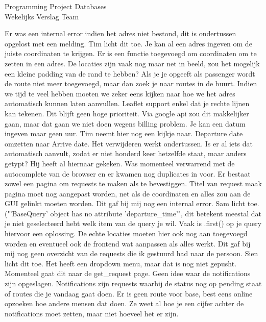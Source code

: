 \documentclass{article}
\newcounter{team}
\begin{document}
\begin{Minutes}{Programming Project Databases \\ Wekelijks Verslag Team }

				    Er was een internal error indien het adres niet bestond, dit is ondertussen opgelost met een melding.
				    Tim licht dit toe. Je kan al een adres ingeven om de juiste coordinaten te krijgen. Er is een functie toegevoegd om coordinaten om te zetten in een adres. De locaties zijn vaak nog maar net in beeld, zou het mogelijk een kleine padding van de rand te hebben? Als je je opgeeft als passenger wordt de route niet meer toegevoegd, maar dan zoek je naar routes in de buurt. Indien we tijd te veel hebben moeten we zeker eens kijken naar hoe we het adres automatisch kunnen laten aanvullen. Leaflet support enkel dat je rechte lijnen kan tekenen. Dit blijft geen hoge prioriteit. Via google api zou dit makkelijker gaan, maar dat gaan we niet doen wegens billing problem. Je kan een datum ingeven maar geen uur. Tim neemt hier nog een kijkje naar. Departure date omzetten naar Arrive date.
			        Het verwijderen werkt ondertussen. Is er al iets dat automatisch aanvult, zodat er niet honderd keer hetzelfde staat, maar anders getypt? Hij heeft al hiernaar gekeken. Was momenteel verwarrend met de autocomplete van de browser en er kwamen nog duplicates in voor.
					Er bestaat zowel een pagina om requests te maken als te bevestiggen. Titel van request maak pagina moet nog aangepast worden, net als de coordinaten en alles zou aan de GUI gelinkt moeten worden.
				    Dit gaf bij mij nog een internal error. Sam licht toe. ("'BaseQuery' object has no attribute 'departure\_time'", dit betekent meestal dat je niet geselecteerd hebt welk item van de query je wil. Vaak is .first() op je query hiervoor een oplossing. De echte locaties moeten hier ook nog aan toegevoegd worden en eventueel ook de frontend wat aanpassen als alles werkt.
				   Dit gaf bij mij nog geen overzicht van de requests die ik gestuurd had naar de persoon. Sien licht dit toe. Het heeft een dropdown menu, maar dat is nog niet gepusht. Momenteel gaat dit naar de get\_request page. Geen idee waar de notifications zijn opgeslagen. Notifications zijn  requests waarbij de status nog op pending staat of routes die je vandaag gaat doen. Er is geen route voor base, best eens online opzoeken hoe andere mensen dat doen. Ze weet al hoe je een cijfer achter de notifications moet zetten, maar niet hoeveel het er zijn.

\end{Minutes}
\end{document}
